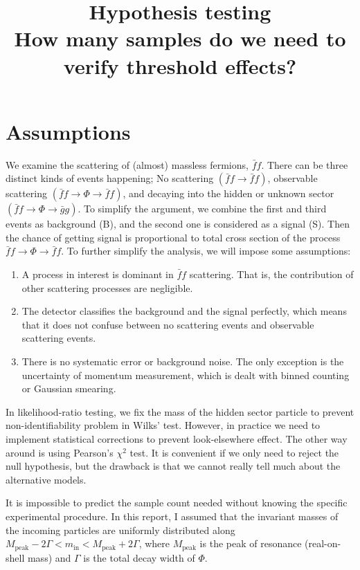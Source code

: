 \documentclass[10pt]{article}
\theoremstyle{definition}
\theoremstyle{remark}
\begin{document}
	\title{Hypothesis testing\\ \small How many samples do we need to verify threshold effects?}
	\maketitle
	\section{Assumptions}
	We examine the scattering of (almost) massless fermions, $\bar{f}f$.
	There can be three distinct kinds of events happening;
	No scattering $(\bar{f}f\to\bar{f}f)$, observable scattering $(\bar{f}f\to\Phi\to\bar{f}f)$, and decaying into the hidden or unknown sector $(\bar{f}f\to\Phi\to\bar{g}g)$.
	To simplify the argument, we combine the first and third events as background (B), and the second one is considered as a signal (S).
	Then the chance of getting signal is proportional to total cross section of the process $\bar{f}f\to\Phi\to\bar{f}f$.
	To further simplify the analysis, we will impose some assumptions:
	\begin{enumerate}
		\item A process in interest is dominant in $\bar{f}f$ scattering.
		That is, the contribution of other scattering processes are negligible.
		
		\item The detector classifies the background and the signal perfectly, which means that it does not confuse between no scattering events and observable scattering events.
		
		\item There is no systematic error or background noise.
		The only exception is the uncertainty of momentum measurement, which is dealt with binned counting or Gaussian smearing.
	\end{enumerate}
	In likelihood-ratio testing, we fix the mass of the hidden sector particle to prevent non-identifiability problem in Wilks' test\cite{algeri2020searching}.
	However, in practice we need to implement statistical corrections to prevent look-elsewhere effect.
	The other way around is using Pearson's $\chi^{2}$ test.
	It is convenient if we only need to reject the null hypothesis, but the drawback is that we cannot really tell much about the alternative models.
	
	It is impossible to predict the sample count needed without knowing the specific experimental procedure.
	In this report, I assumed that the invariant masses of the incoming particles are uniformly distributed along $M_{\mathrm{peak}}-2\Gamma<m_{\mathrm{in}}<M_{\mathrm{peak}}+2\Gamma$, where $M_{\mathrm{peak}}$ is the peak of resonance (real-on-shell mass) and $\Gamma$ is the total decay width of $\Phi$.
	
\end{document}
